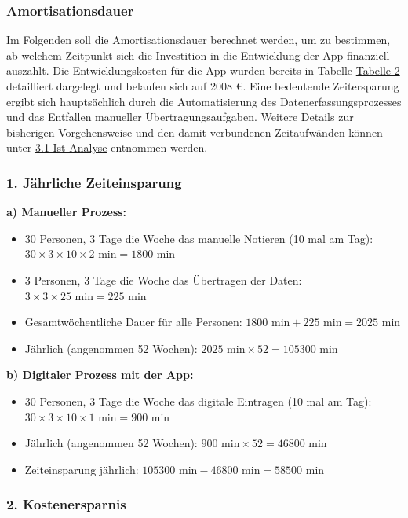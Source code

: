 \documentclass[a4paper,12pt]{article}
\begin{document}
\subsubsection{Amortisationsdauer}
Im Folgenden soll die Amortisationsdauer berechnet werden, um zu bestimmen, ab welchem Zeitpunkt sich die Investition in die Entwicklung der App finanziell auszahlt. Die Entwicklungskosten für die App wurden bereits in Tabelle \hyperlink{Kostenaufstellung}{Tabelle 2} detailliert dargelegt und belaufen sich auf 2008 €. Eine bedeutende Zeitersparung ergibt sich hauptsächlich durch die Automatisierung des Datenerfassungsprozesses und das Entfallen manueller Übertragungsaufgaben. Weitere Details zur bisherigen Vorgehensweise und den damit verbundenen Zeitaufwänden können unter \hyperref[sec:Ist-Analyse]{3.1 Ist-Analyse} entnommen werden.

\subsubsection*{1. Jährliche Zeiteinsparung}

\textbf{a) Manueller Prozess:}
\begin{itemize}
    \item 30 Personen, 3 Tage die Woche das manuelle Notieren (10 mal am Tag): $30 \times 3 \times 10 \times 2 \text{ min} = 1800 \text{ min}$
    \item 3 Personen, 3 Tage die Woche das Übertragen der Daten: $3 \times 3 \times 25 \text{ min} = 225 \text{ min}$
    \item Gesamtwöchentliche Dauer für alle Personen: $1800 \text{ min} + 225 \text{ min} = 2025 \text{ min}$
    \item Jährlich (angenommen 52 Wochen): $2025 \text{ min} \times 52 = 105300 \text{ min}$
\end{itemize}
\textbf{b) Digitaler Prozess mit der App:}
\begin{itemize}
    \item 30 Personen, 3 Tage die Woche das digitale Eintragen (10 mal am Tag): $30 \times 3 \times 10 \times 1 \text{ min} = 900 \text{ min}$
    \item Jährlich (angenommen 52 Wochen): $900 \text{ min} \times 52 = 46800 \text{ min}$
    \item Zeiteinsparung jährlich: $105300 \text{ min} - 46800 \text{ min} = 58500 \text{ min}$
\end{itemize}

\subsubsection*{2. Kostenersparnis}
\end{document}
